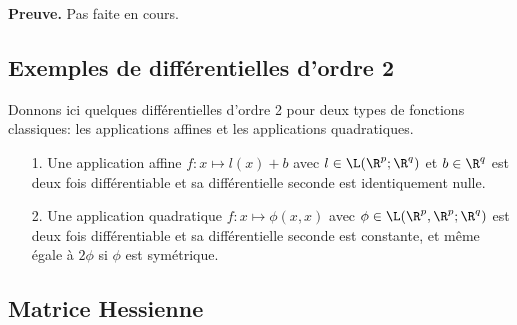 \documentclass[12pt, class=report,crop=false]{standalone}
\begin{document}
\noindent \textbf{Preuve.} Pas faite en cours.

\subsection{Exemples de diff\'erentielles d'ordre 2}
Donnons ici quelques différentielles d'ordre 2 pour deux types de fonctions classiques: les applications affines et les applications quadratiques. 

\begin{itemize}
  \item[1.] Une application affine $f:x \mapsto l(x)+b$ avec $l \in \L(\R^p;\R^q)$ et $b \in \R^q$
est deux fois diff\'erentiable et sa diff\'erentielle seconde est identiquement nulle.
 \item[2.] Une application quadratique $f: x \mapsto \phi(x,x)$ avec $\phi \in \L(\R^p,\R^p;\R^q)$
est deux fois diff\'erentiable et sa diff\'erentielle seconde est constante, et m\^eme \'egale \`a $2\phi$ si
$\phi$ est sym\'etrique.
\end{itemize}

\subsection{Matrice Hessienne}
\end{document}
